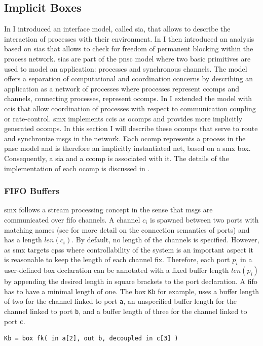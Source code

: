 \subsection{Implicit Boxes}
\label{sect_smx_box_implicit}
In \Chap{\ref{chap_ecm}} I introduced an interface model, called \gls{sia}, that allows to describe the interaction of processes with their environment.
In \Chap{\ref{chap_block}} I then introduced an analysis based on \glspl{sia} that allows to check for freedom of permanent blocking within the process network.
\Glspl{sia} are part of the \gls{pnsc} model where two basic primitives are used to model an application: processes and synchronous channels.
The model offers a separation of computational and coordination concerns by describing an application as a network of processes where processes represent \glspl*{ccomp} and channels, connecting processes, represent \glspl*{ocomp}.
In \Chap{\ref{chap_tcm}} I extended the model with \glspl{cci} that allow coordination of processes with respect to communication coupling or rate-control.
\Gls*{smx} implements \glspl{cci} as \glspl*{ocomp} and provides more implicitly generated \glspl*{ocomp}.
In this section I will describe these \glspl*{ocomp} that serve to route and synchronize \glspl*{msg} in the network.
Each \gls*{ocomp} represents a process in the \gls{pnsc} model and is therefore an implicitly instantiated net, based on a \gls*{smx} box.
Consequently, a \gls{sia} and a \gls*{ccomp} is associated with it.
The details of the implementation of each \gls*{ocomp} is discussed in \Chap{\ref{chap_tool}}.

\subsubsection{FIFO Buffers}
\label{sect_smx_box_implicit_fifo}
\Gls*{smx} follows a stream processing concept in the sense that \glspl*{msg} are communicated over \gls{fifo} channels.
A channel $c_i$ is spawned between two ports with matching names (see \Sect{\ref{sect_smx_nets}} for more detail on the connection semantics of ports) and has a length $len(c_i)$.
By default, no length of the channels is specified.
However, as \gls*{smx} targets \glspl{cps} where controllability of the system is an important aspect it is reasonable to keep the length of each channel fix.
Therefore, each port $p_i$ in a user-defined box declaration can be annotated with a fixed buffer length $len(p_i)$ by appending the desired length in square brackets to the port declaration.
A \gls{fifo} has to have a minimal length of one.
The box \texttt{Kb} for example, uses a buffer length of two for the channel linked to port \texttt{a}, an unspecified buffer length for the channel linked to port \texttt{b}, and a buffer length of three for the channel linked to port \texttt{c}.
\begin{lstlisting}[numbers=none]
Kb = box fk( in a[2], out b, decoupled in c[3] )
\end{lstlisting}

